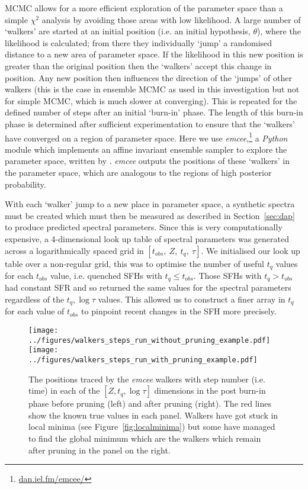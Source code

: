 \documentclass[useAMS,usenatbib]{mn2e}
\begin{document}
MCMC allows for a more efficient exploration of the parameter space than a simple $\chi^2$ analysis by avoiding those areas with low likelihood. A large number of `walkers' are started at an initial position (i.e. an initial hypothesis, $\theta$), where the likelihood is calculated; from there they individually `jump' a randomised distance to a new area of parameter space. If the likelihood in this new position is greater than the original position then the `walkers' accept this change in position. Any new position then influences the direction of the  `jumps' of other walkers (this is the case in ensemble MCMC as used in this investigation but not for simple MCMC, which is much slower at converging). This is repeated for the defined number of steps after an initial `burn-in' phase. The length of this burn-in phase is determined after sufficient experimentation to ensure that the `walkers' have converged on a region of parameter space. Here we use \emph{emcee},\footnote{\url{dan.iel.fm/emcee/}} a \emph{Python} module which implements an affine invariant ensemble sampler to explore the parameter space, written by \cite{emcee13}. \emph{emcee} outputs the positions of these `walkers' in the parameter space, which are analogous to the regions of high posterior probability. 

With each `walker' jump to a new place in parameter space, a synthetic spectra must be created which must then be measured as described in Section~\ref{sec:dap} to produce predicted spectral parameters. Since this is very computationally expensive, a 4-dimensional look up table of spectral parameters was generated across a logarithmically spaced grid in $[t_{obs},~Z,~t_q,~\tau]$. We initialised our look up table over a non-regular grid, this was to optimise the number of useful $t_q$ values for each $t_{obs}$ value, i.e. quenched SFHs with $t_q \leq t_{obs}$. Those SFHs with $t_q > t_{obs}$ had constant SFR and so returned the same values for the spectral parameters regardless of the $t_q, \log\tau$ values. This allowed us to construct a finer array in $t_q$ for each value of $t_{obs}$ to pinpoint recent changes in the SFH more precisely. 

\begin{figure*}
\centering
\texttt{[image: ../figures/walkers\_steps\_run\_without\_pruning\_example.pdf]}
\texttt{[image: ../figures/walkers\_steps\_run\_with\_pruning\_example.pdf]}
\caption{The positions traced by the \emph{emcee} walkers with step number (i.e. time) in each of the $[Z, t_q, \log \tau]$ dimensions in the post burn-in phase before pruning (left) and after pruning (right). The red lines show the known true values in each panel. Walkers have got stuck in local minima (see Figure~\ref{fig:localminima}) but some have managed to find the global minimum which are the walkers which remain after pruning in the panel on the right.}
\label{fig:comparepruning}
\end{figure*}
 
\end{document}

